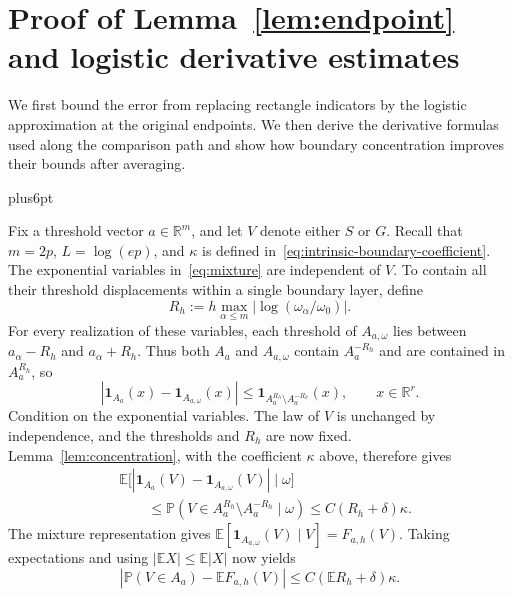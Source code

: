 \documentclass[11pt,letterpaper,twoside,leqno]{article}
\makeatletter
\theoremstyle{bookplain}
\theoremstyle{bookremark}
\renewenvironment{proof}[1][\proofname]{\par
  \pushQED{\qed}\normalfont\topsep6pt plus6pt\relax
  \trivlist\item[\hskip\labelsep\bfseries #1\@addpunct{.}]\ignorespaces
}{\popQED\endtrivlist\@endpefalse}
\newcommand{\E}{\mathbb E}
\newcommand{\Pp}{\mathbb P}
\newcommand{\R}{\mathbb R}
\newcommand{\ind}{\mathbf 1}
\makeatother
\begin{document}
\clearpage
\appendix
{}

\section{Proof of Lemma~\ref*{lem:endpoint} and logistic derivative estimates}\label{appx-sec:smoothing}
We first bound the error from replacing rectangle indicators by the
logistic approximation at the original endpoints. We then derive
the derivative formulas used along the comparison path and show how
boundary concentration improves their bounds after averaging.

\begin{proof}[Proof of Lemma~\ref{lem:endpoint}]
Fix a threshold vector $a\in\R^m$, and let $V$ denote either $S$ or
$G$. Recall that $m=2p$, $L=\log(ep)$, and $\kappa$ is defined
in~\eqref{eq:intrinsic-boundary-coefficient}. The exponential variables
in~\eqref{eq:mixture} are independent of $V$. To contain all their
threshold displacements within a single boundary layer, define
\[
 R_h:=h\max_{\alpha\le m}|\log(\omega_\alpha/\omega_0)|.
\]
For every realization of these variables, each threshold of
$A_{a,\omega}$ lies between $a_\alpha-R_h$ and $a_\alpha+R_h$.
Thus both $A_a$ and $A_{a,\omega}$ contain $A_a^{-R_h}$ and are
contained in $A_a^{R_h}$, so
\[
 |\ind_{A_a}(x)-\ind_{A_{a,\omega}}(x)|
 \le\ind_{A_a^{R_h}\setminus A_a^{-R_h}}(x),
 \qquad x\in\R^r.
\]
Condition on the exponential variables. The law of $V$ is unchanged
by independence, and the thresholds and $R_h$ are now fixed.
Lemma~\ref{lem:concentration}, with the coefficient $\kappa$ above,
therefore gives
\[
 \begin{aligned}
 &\E\bigl[
   |\ind_{A_a}(V)-\ind_{A_{a,\omega}}(V)|\mid\omega\bigr]\\
 &\hspace{2em}\le
 \Pp(V\in A_a^{R_h}\setminus A_a^{-R_h}\mid\omega)
 \le C(R_h+\delta)\kappa.
 \end{aligned}
\]
The mixture representation gives
$\E[\ind_{A_{a,\omega}}(V)\mid V]=F_{a,h}(V)$.
Taking expectations and using $|\E X|\le\E|X|$ now yields
\[
 |\Pp(V\in A_a)-\E F_{a,h}(V)|
 \le C(\E R_h+\delta)\kappa.
\]


\end{proof}
\end{document}
